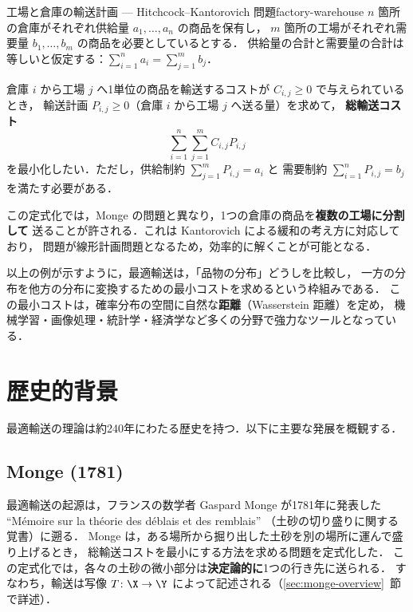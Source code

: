 \begin{example}{工場と倉庫の輸送計画 --- Hitchcock--Kantorovich 問題}{factory-warehouse}
  $n$ 箇所の倉庫がそれぞれ供給量 $a_1, \ldots, a_n$ の商品を保有し，
  $m$ 箇所の工場がそれぞれ需要量 $b_1, \ldots, b_m$ の商品を必要としているとする．
  供給量の合計と需要量の合計は等しいと仮定する：$\sum_{i=1}^n a_i = \sum_{j=1}^m b_j$．

  倉庫 $i$ から工場 $j$ へ1単位の商品を輸送するコストが $C_{i,j} \geq 0$ で与えられているとき，
  輸送計画 $P_{i,j} \geq 0$（倉庫 $i$ から工場 $j$ へ送る量）を求めて，
  \textbf{総輸送コスト}
  \[
    \sum_{i=1}^n \sum_{j=1}^m C_{i,j} P_{i,j}
  \]
  を最小化したい．ただし，供給制約 $\sum_{j=1}^m P_{i,j} = a_i$ と
  需要制約 $\sum_{i=1}^n P_{i,j} = b_j$ を満たす必要がある．

  この定式化では，Monge の問題と異なり，1つの倉庫の商品を\textbf{複数の工場に分割して}
  送ることが許される．これは Kantorovich による緩和の考え方に対応しており，
  問題が線形計画問題となるため，効率的に解くことが可能となる．
\end{example}

以上の例が示すように，最適輸送は，「品物の分布」どうしを比較し，
一方の分布を他方の分布に変換するための最小コストを求めるという枠組みである．
この最小コストは，確率分布の空間に自然な\textbf{距離}（Wasserstein 距離）を定め，
機械学習・画像処理・統計学・経済学など多くの分野で強力なツールとなっている．

\section{歴史的背景}
\label{sec:history}

最適輸送の理論は約240年にわたる歴史を持つ．以下に主要な発展を概観する．

\subsection*{Monge (1781)}

最適輸送の起源は，フランスの数学者 Gaspard Monge が1781年に発表した
``M\'{e}moire sur la th\'{e}orie des d\'{e}blais et des remblais''
（土砂の切り盛りに関する覚書）に遡る．
Monge は，ある場所から掘り出した土砂を別の場所に運んで盛り上げるとき，
総輸送コストを最小にする方法を求める問題を定式化した．
この定式化では，各々の土砂の微小部分は\textbf{決定論的に}1つの行き先に送られる．
すなわち，輸送は写像 $T\colon \X \to \Y$ によって記述される（\ref{sec:monge-overview}~節で詳述）．

